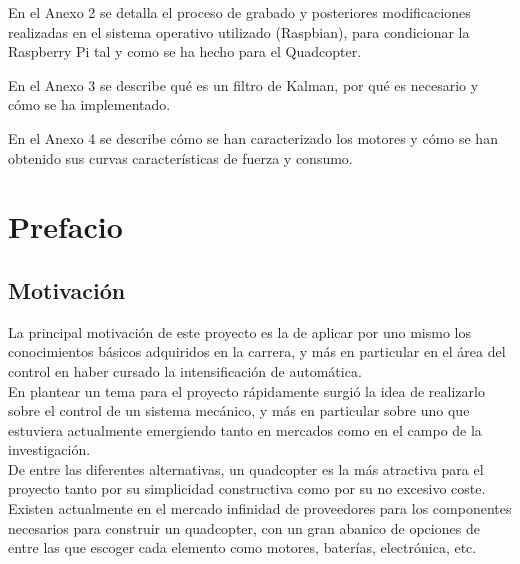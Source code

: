 \documentclass[twoside]{article}
\begin{document}
En el Anexo 2 se detalla el proceso de grabado y posteriores modificaciones realizadas en el sistema operativo utilizado (Raspbian), para condicionar la Raspberry Pi tal y como se ha hecho para el Quadcopter.
 
En el Anexo 3 se describe qué es un filtro de Kalman, por qué es necesario y cómo se ha implementado. 

En el Anexo 4 se describe cómo se han caracterizado los motores y cómo se han obtenido sus curvas características de fuerza y consumo. 




\newpage
\begin{center}

\end{center}
\thispagestyle{empty}
\newpage

\setcounter{page}{1}
\tableofcontents
{}
\fancyfoot[C]{}
\newpage
\fancyhead[LE,RO]{\thepage}
\setcounter{page}{4}
\listoffigures
\newpage

\section{Prefacio} \label{prefacio}
\subsection{Motivación}

La principal motivación de este proyecto es la de aplicar por uno mismo los conocimientos básicos adquiridos en la carrera, y más en particular en el área del control en haber cursado la intensificación de automática.\\

En plantear un tema para el proyecto rápidamente surgió la idea de realizarlo sobre el control de un sistema mecánico, y más en particular sobre uno que estuviera actualmente emergiendo tanto en mercados como en el campo de la investigación.\\ 

De entre las diferentes alternativas, un quadcopter es la más atractiva para el proyecto tanto por su simplicidad constructiva como por su no excesivo coste. Existen actualmente en el mercado infinidad de proveedores para los componentes necesarios para construir un quadcopter, con un gran abanico de opciones de entre las que escoger cada elemento como motores, baterías, electrónica, etc.\\
\end{document}
